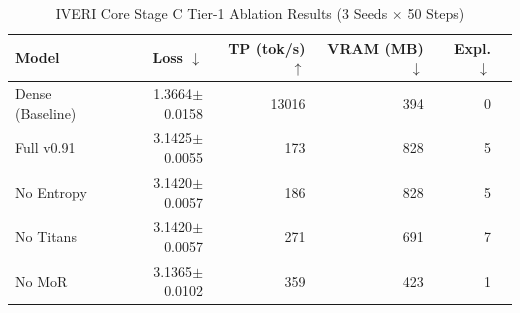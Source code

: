 \begin{table}[h]
\centering
\caption{IVERI Core Stage C Tier-1 Ablation Results (3 Seeds $\times$ 50 Steps)}
\label{tab:tier1}
\begin{tabular}{lrrrrc}
\hline
Model & Loss $\downarrow$ & TP (tok/s) $\uparrow$ & VRAM (MB) $\downarrow$ & Expl. $\downarrow$ \\
\hline
Dense (Baseline) & 1.3664$\pm$0.0158 & 13016 & 394 & 0 \\
Full v0.91 & 3.1425$\pm$0.0055 & 173 & 828 & 5 \\
No Entropy & 3.1420$\pm$0.0057 & 186 & 828 & 5 \\
No Titans & 3.1420$\pm$0.0057 & 271 & 691 & 7 \\
No MoR & 3.1365$\pm$0.0102 & 359 & 423 & 1 \\
\hline
\end{tabular}
\end{table}